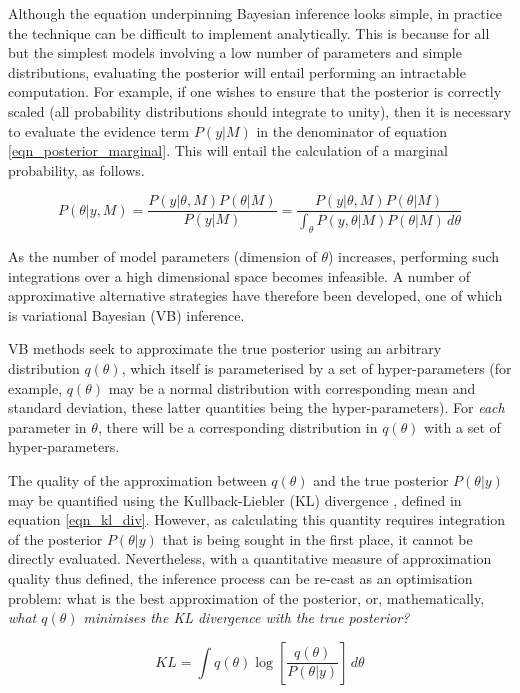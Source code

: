 Although the equation underpinning Bayesian inference looks simple, in practice the technique can be difficult to implement analytically. This is because for all but the simplest models involving a low number of parameters and simple distributions, evaluating the posterior will entail performing an intractable computation. For example, if one wishes to ensure that the posterior is correctly scaled (all probability distributions should integrate to unity), then it is necessary to evaluate the evidence term $P(y | M)$ in the denominator of equation \ref{eqn_posterior_marginal}. This will entail the calculation of a marginal probability, as follows. 

\begin{equation} 
P(\theta | y, M) = \frac{ P(y | \theta, M) P(\theta | M) }{ P(y | M) }= \frac{ P(y | \theta, M) P(\theta | M) }{ \int_{\theta} P(y,\theta | M)P(\theta | M) \,d\theta }
\label{eqn_posterior_marginal}
\end{equation}

As the number of model parameters (dimension of $\theta$) increases, performing such integrations over a high dimensional space becomes infeasible. A number of approximative alternative strategies have therefore been developed, one of which is variational Bayesian (VB) inference. 

VB methods seek to approximate the true posterior using an arbitrary distribution $q(\theta)$, which itself is parameterised by a set of hyper-parameters (for example, $q(\theta)$ may be a normal distribution with corresponding mean and standard deviation, these latter quantities being the hyper-parameters). For \textit{each} parameter in $\theta$, there will be a corresponding distribution in $q(\theta)$ with a set of hyper-parameters. 

The quality of the approximation between $q(\theta)$ and the true posterior $P(\theta | y)$ may be quantified using the Kullback-Liebler (KL) divergence \cite{Wani2020}, defined in equation \ref{eqn_kl_div}. However, as calculating this quantity requires integration of the posterior $P(\theta|y)$ that is being sought in the first place, it cannot be directly evaluated. Nevertheless, with a quantitative measure of approximation quality thus defined, the inference process can be re-cast as an optimisation problem: what is the best approximation of the posterior, or, mathematically, \textit{what $q(\theta)$ minimises the KL divergence with the true posterior?}

\begin{equation} 
KL = \int q(\theta) \log{ \left[ \frac{ q(\theta)  }{ P(\theta|y) } \right] } \, d\theta
\label{eqn_kl_div}
\end{equation}

